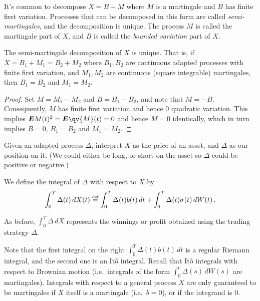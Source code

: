 \begin{remark}
  It's common to decompose $X = B + M$ where $M$ is a martingale and $B$ has finite first variation.
  Processes that can be decomposed in this form are called \emph{semi-martingales}, and the decomposition is unique.
  The process $M$ is called the martingale part of $X$, and $B$ is called the \emph{bounded variation} part of $X$.
\end{remark}

\begin{proposition}\label{p:3smuniq}
  The semi-martingale decomposition of $X$ is unique.
  That is, if $X = B_1 + M_1 = B_2 + M_2$ where $B_1, B_2$ are continuous adapted processes with finite first variation, and $M_1, M_2$ are continuous (square integrable) martingales, then $B_1 = B_2$ and $M_1 = M_2$.
\end{proposition}
\begin{proof}
  Set $M = M_1 - M_2$ and $B = B_1 - B_2$, and note that $M = -B$.
  Consequently, $M$ has finite first variation and hence $0$ quadratic variation.
  This implies $\E M(t)^2 = \E \qv{M}(t) = 0$ and hence $M = 0$ identically, which in turn implies $B = 0$, $B_1 = B_2$ and $M_1 = M_2$.
\end{proof}

Given an adapted process $\Delta$, interpret $X$ as the price of an asset, and $\Delta$ as our position on it.
(We could either be long, or short on the asset so $\Delta$ could be positive or negative.)

\begin{definition}
  We define the  integral of $\Delta$ with respect to $X$ by
  \begin{equation*}
    \int_0^T \Delta(t) \, dX(t)
      \stackrel{\scriptscriptstyle\textup{def}}{=} \int_0^T \Delta(t) b(t) \, dt 
	+ \int_0^T \Delta(t) \sigma(t) \, dW(t)\,.
  \end{equation*}
\end{definition}

As before, $\int_0^T \Delta \, dX$ represents the winnings or profit obtained using the trading strategy $\Delta$.

\begin{remark}
  Note that the first integral on the right $\int_0^T \Delta(t) b(t) \, dt$ is a regular Riemann integral, and the second one is an It\^o integral.
  Recall that It\^o integrals with respect to Brownian motion (i.e.\ integrals of the form $\int_0^t \Delta(s) \, dW(s)$ are martingales).
  Integrals with respect to a general process $X$ are only guaranteed to be martingales if $X$ itself is a martingale (i.e.\ $b = 0$), or if the integrand is $0$.
\end{remark}


